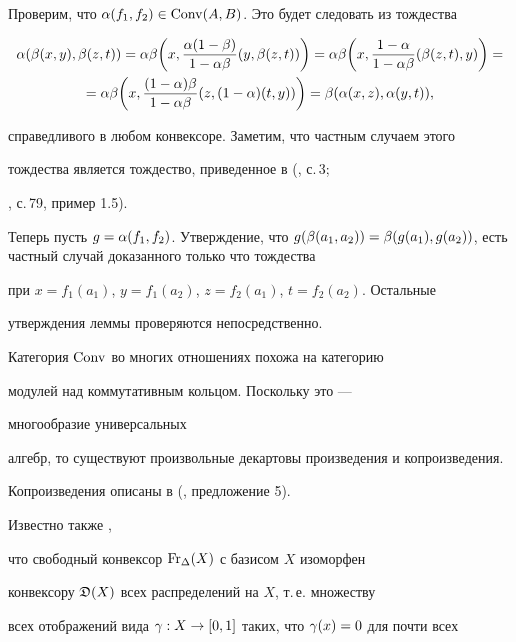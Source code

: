 \begin{pf}


Проверим, что $\alpha(f_1,f_2)\in \operatorname{Conv}(A,B)$. Это будет следовать из тождества


\begin{multline*}


\al(\be(x,y),\be(z,t))=\al\be\bigg(x,\frac{\al(1-\be)}


{1-\al\be}(y,\be(z,t))\bigg)=


\al\be\bigg(x,\frac{1-\al}{1-\al\be}(\be(z,t),y)\bigg)=\\


=\al\be\bigg(x,\frac{(1-\al)\be}{1-\al\be}(z,(1-\al)(t,y))\bigg)=


\be(\al(x,z),\al(y,t)),


\end{multline*}


справедливого в любом конвексоре. Заметим, что частным случаем этого


тождества является тождество, приведенное в (\cite{Sc1}, с.\,3;


\cite{Mov2}, с.\,79, пример 1.5).


Теперь пусть $g=\al(f_1,f_2)$. Утверждение, что $g(\be(a_1,a_2))=


\be(g(a_1),g(a_2))$, есть частный случай доказанного только что тождества


при $x=f_1(a_1)$, $y=f_1(a_2)$, $z=f_2(a_1)$, $t=f_2(a_2)$. Остальные


утверждения леммы проверяются непосредственно.


\end{pf}





Категория $\operatorname{Conv}$ во многих отношениях похожа на категорию


модулей над коммутативным кольцом. Поскольку это --- 


многообразие универсальных


алгебр, то существуют произвольные декартовы произведения и копроизведения.


Копроизведения описаны в (\cite{Sc2}, предложение 5).


Известно также \cite{Sc1},


что свободный конвексор $\operatorname{Fr}_{\Delta}(X)$ с базисом $X$ изоморфен


конвексору ${\frak D}(X)$ всех распределений на $X$, т.\,е. множеству


всех отображений вида $\gamma: X\to [0,1]$ таких, что $\gamma(x)=0$ для почти всех


